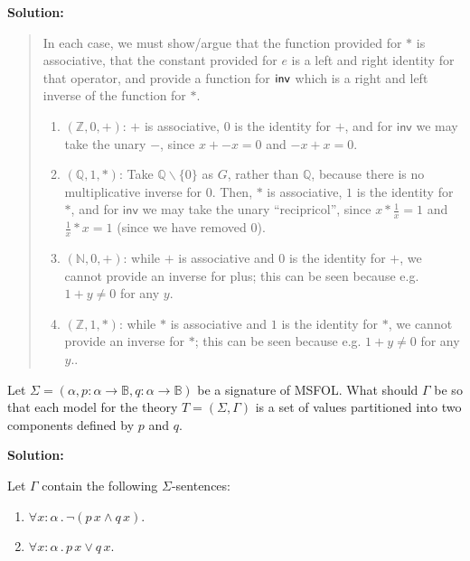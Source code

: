 \documentclass[11pt,fleqn]{article}
\newcommand{\be}{\begin{enumerate}}
\newcommand{\ee}{\end{enumerate}}
\newcommand{\mname}[1]{\mbox{\sf #1}}
\newcommand{\Neg}{\neg}
\newcommand{\Or}{\vee}
\newcommand{\Forall}{\forall}
\newcommand{\mdot}{\mathrel.}
\begin{document}
  \textbf{Solution:}
    \begin{quote}
      In each case, we must show/argue that the function provided for $*$ is associative, 
      that the constant provided for $e$ is a left and right identity for that operator, and provide 
      a function for $\mname{inv}$ which is a right and left inverse of the function for $*$.

  \be
    \item[$(\mathbb{Z},0,+)$:] $+$ is associative, $0$ is the identity for $+$, and for $\textsf{inv}$ 
      we may take the unary $-$, since $x + - x = 0$ and $- x + x = 0$.
    \item[$(\mathbb{Q},1,*)$:] Take $\mathbb{Q} \backslash \{ 0 \}$ as $G$, rather than $\mathbb{Q}$, 
      because there is no multiplicative inverse for $0$. Then, $*$ is associative, $1$ is the identity for $*$, 
      and for $\textsf{inv}$ we may take the unary ``recipricol'', since $x * \frac{1}{x} = 1$ and $\frac{1}{x} 
      * x = 1$ (since we have removed $0$).
    \item[$(\mathbb{N},0,+)$:] while $+$ is associative and $0$ is the identity for $+$, we cannot provide an 
      inverse for plus; this can be seen because e.g. $1 + y \neq 0$ for any $y$.
    \item[$(\mathbb{Z},1,*)$:] while $*$ is associative and $1$ is the identity for $*$, we cannot provide an 
      inverse for $*$; this can be seen because e.g. $1 + y \neq 0$ for any $y$..
  \ee
\end{quote}

  \item Let $\Sigma = (\alpha, p : \alpha \rightarrow \mathbb{B}, q :
    \alpha \rightarrow \mathbb{B})$ be a signature of MSFOL.  What
    should $\Gamma$ be so that each model for the theory $T =
    (\Sigma,\Gamma)$ is a set of values partitioned into two
    components defined by $p$ and $q$.

  \textbf{Solution:}

    Let $\Gamma$ contain the following $\Sigma$-sentences:

    \begin{enumerate}

      \item $\Forall x : \alpha \mdot \Neg(p\,x \land q\,x)$.

      \item $\Forall x : \alpha \mdot p\,x \Or q\,x$.

    \end{enumerate}
\end{document}
